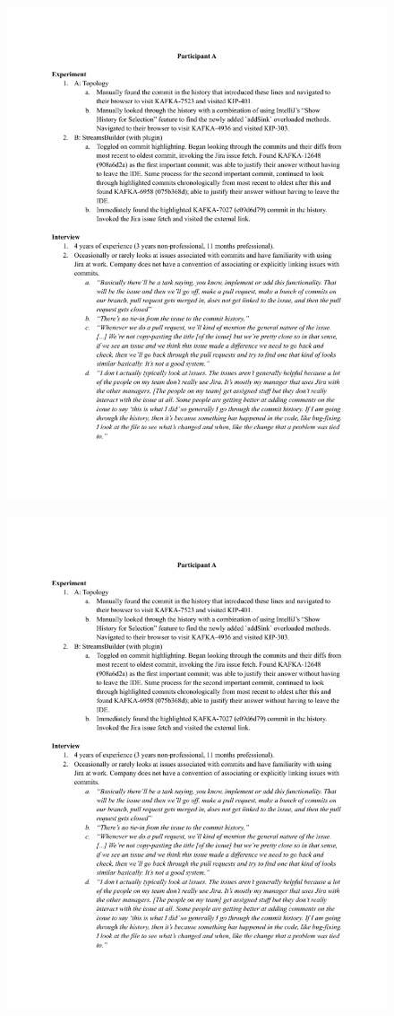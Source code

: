 \begin{figure}[H]
    \includegraphics[page=18,width=\textwidth]{./files/session-summaries.pdf}
\end{figure}

\begin{figure}[H]
    \includegraphics[page=19,width=\textwidth]{./files/session-summaries.pdf}
\end{figure}

\endinput